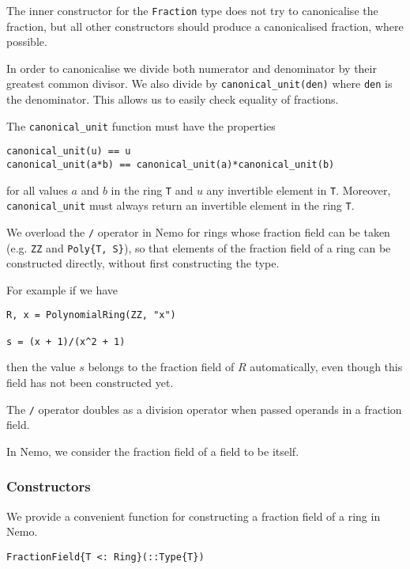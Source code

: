 \documentclass[a4paper,10pt]{article}
\newcommand{\code}{\lstinline}
\begin{document}
{{{The inner constructor for the \code{Fraction} type does not try to canonicalise
the fraction, but all other constructors should produce a canonicalised
fraction, where possible.

In order to canonicalise we divide both numerator and denominator by their
greatest common divisor. We also divide by \code{canonical_unit(den)} where
\code{den} is the denominator. This allows us to easily check equality of
fractions.

The \code{canonical_unit} function must have the properties

\begin{lstlisting}
canonical_unit(u) == u
canonical_unit(a*b) == canonical_unit(a)*canonical_unit(b)
\end{lstlisting}

for all values $a$ and $b$ in the ring \code{T} and $u$ any invertible element
in \code{T}. Moreover, \code{canonical_unit} must always return an invertible
element in the ring \code{T}.

We overload the \code{/} operator in Nemo for rings whose fraction field can
be taken (e.g. \code{ZZ} and \code|Poly{T, S}|), so that elements of the
fraction field of a ring can be constructed directly, without first
constructing the type.

For example if we have

\begin{lstlisting}
R, x = PolynomialRing(ZZ, "x")

s = (x + 1)/(x^2 + 1)
\end{lstlisting}

then the value $s$ belongs to the fraction field of $R$ automatically, even
though this field has not been constructed yet.

The \code{/} operator doubles as a division operator when passed operands
in a fraction field.

In Nemo, we consider the fraction field of a field to be itself.

\subsubsection{Constructors}

We provide a convenient function for constructing a fraction field of a ring in
Nemo.

\begin{lstlisting}
FractionField{T <: Ring}(::Type{T})
\end{lstlisting}

}}}
\end{document}

